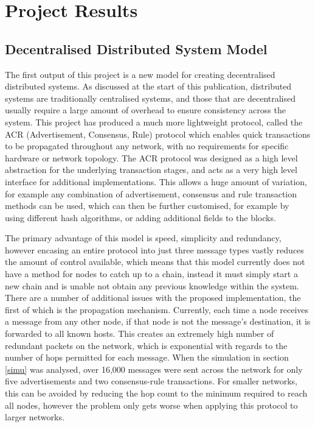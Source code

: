 \documentclass[a4paper, 11pt]{report}
\begin{document}
\section{Project Results}

\subsection{Decentralised Distributed System Model}
The first output of this project is a new model for creating decentralised distributed systems. As discussed at the start of this publication, distributed systems are traditionally centralised systems, and those that are decentralised usually require a large amount of overhead to ensure consistency across the system. This project has produced a much more lightweight protocol, called the ACR (Advertisement, Consensus, Rule) protocol which enables quick transactions to be propagated throughout any network, with no requirements for specific hardware or network topology. The ACR protocol was designed as a high level abstraction for the underlying transaction stages, and acts as a very high level interface for additional implementations. This allows a huge amount of variation, for example any combination of advertisement, consensus and rule transaction methods can be used, which can then be further customised, for example by using different hash algorithms, or adding additional fields to the blocks.

The primary advantage of this model is speed, simplicity and redundancy, however encasing an entire protocol into just three message types vastly reduces the amount of control available, which means that this model currently does not have a method for nodes to catch up to a chain, instead it must simply start a new chain and is unable not obtain any previous knowledge within the system. There are a number of additional issues with the proposed implementation, the first of which is the propagation mechanism. Currently, each time a node receives a message from any other node, if that node is not the message's destination, it is forwarded to all known hosts. This creates an extremely high number of redundant packets on the network, which is exponential with regards to the number of hops permitted for each message. When the simulation in section \ref{simu} was analysed, over 16,000 messages were sent across the network for only five advertisements and two consensus-rule transactions. For smaller networks, this can be avoided by reducing the hop count to the minimum required to reach all nodes, however the problem only gets worse when applying this protocol to larger networks.
\end{document}
